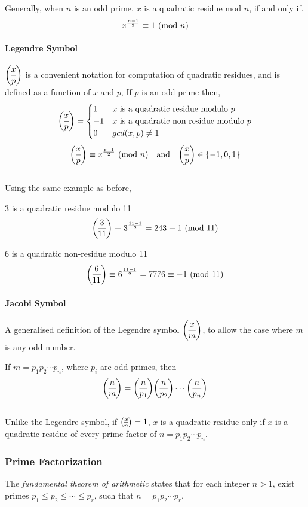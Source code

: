 \bigskip
\noindent
Generally, when $n$ is an odd prime, $x$ is a quadratic residue mod $n$, if and only if.
$$x^{\frac{n-1}{2}} \equiv 1 \ (\mathrm{mod}\ n)$$

\paragraph{Legendre Symbol} $\dlegendre{x}{p}$ is a convenient notation for computation of quadratic residues, and is defined as a function of $x$ and $p$,
\bigskip
\newline
If $p$ is an odd prime then,
$$
\dlegendre{x}{p} =
		\begin{cases}
			1 & \text{$x$ is a quadratic residue modulo $p$}\\
			-1 & \text{$x$ is a quadratic non-residue modulo $p$}\\
			0 & \text{$gcd(x, p) \not = 1$}\\
		\end{cases}
$$
\smallskip
$$
\dlegendre{x}{p} \equiv x^{\frac{p - 1}{2}} \Mod{n} \quad \text{and} \quad \dlegendre{x}{p} \in \{-1, 0, 1\}
$$\\
Using the same example as before,

\begin{description}
	\item 3 is a quadratic residue modulo 11
	\medskip
	$$\dlegendre{3}{11}\equiv 3^{\frac{11-1}{2}} = 243 \equiv 1 \Mod{11}$$
	\item 6 is a quadratic non-residue modulo 11
	\medskip
	$$\dlegendre{6}{11}\equiv 6^{\frac{11-1}{2}} = 7776  \equiv -1 \Mod{11}$$

\end{description}

\paragraph{Jacobi Symbol}
A generalised definition of the Legendre symbol $\dlegendre{x}{m}$, to allow the case where $m$ is any odd number.

If $m = p_1p_2 \cdots p_n$, where $p_i$ are odd primes, then
$$\dlegendre{n}{m} = \dlegendre{n}{p_1}\dlegendre{n}{p_2} \cdots\dlegendre{n}{p_n}$$
\\
Unlike the Legendre symbol, if $\legendre{x}{n} = 1$, $x$ is a quadratic residue only if $x$ is a quadratic residue of every prime factor of $n=p_1p_2 \cdots p_n$.

\subsubsection{Prime Factorization}
The \textit{fundamental theorem of arithmetic} \cite{andrews1994number} states that for each integer \newline $n > 1$, exist primes $p_1 \le p_2 \le \cdots \le p_r$, such that $n = p_1 p_2 \cdots p_r$.

